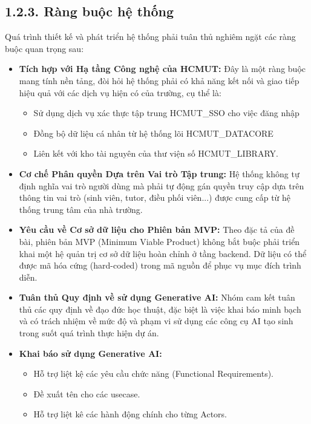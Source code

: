 \subsection*{1.2.3. Ràng buộc hệ thống}
Quá trình thiết kế và phát triển hệ thống phải tuân thủ nghiêm ngặt các ràng buộc quan trọng sau:
\begin{itemize}
    \item \textbf{Tích hợp với Hạ tầng Công nghệ của HCMUT:} Đây là một ràng buộc mang tính nền tảng, đòi hỏi hệ thống phải có khả năng kết nối và giao tiếp hiệu quả với các dịch vụ hiện có của trường, cụ thể là:

    \begin{itemize}
        \item Sử dụng dịch vụ xác thực tập trung HCMUT\_SSO cho việc đăng nhập
        \item Đồng bộ dữ liệu cá nhân từ hệ thống lõi HCMUT\_DATACORE
        \item Liên kết với kho tài nguyên của thư viện số HCMUT\_LIBRARY.
    \end{itemize}
    \item \textbf{Cơ chế Phân quyền Dựa trên Vai trò Tập trung:} Hệ thống không tự định nghĩa vai trò người dùng mà phải tự động gán quyền truy cập dựa trên thông tin vai trò (sinh viên, tutor, điều phối viên...) được cung cấp từ hệ thống trung tâm của nhà trường.
    \item \textbf{Yêu cầu về Cơ sở dữ liệu cho Phiên bản MVP:} Theo đặc tả của đề bài, phiên bản MVP (Minimum Viable Product) không bắt buộc phải triển khai một hệ quản trị cơ sở dữ liệu hoàn chỉnh ở tầng backend. Dữ liệu có thể được mã hóa cứng (hard-coded) trong mã nguồn để phục vụ mục đích trình diễn.
    \item \textbf{Tuân thủ Quy định về sử dụng Generative AI:} Nhóm cam kết tuân thủ các quy định về đạo đức học thuật, đặc biệt là việc khai báo minh bạch và có trách nhiệm về mức độ và phạm vi sử dụng các công cụ AI tạo sinh trong suốt quá trình thực hiện dự án.
    \item \textbf{Khai báo sử dụng Generative AI:}
    \begin{itemize}
        \item Hỗ trợ liệt kệ các yêu cầu chức năng (Functional Requirements).
        \item Đề xuất tên cho các usecase.
        \item Hỗ trợ liệt kê các hành động chính cho từng Actors.
    \end{itemize}

\end{itemize}

